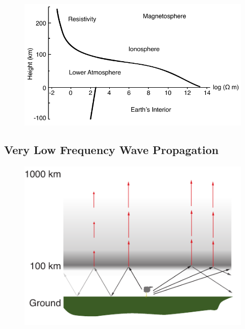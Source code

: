 \begin{figure}[ht!]
	\centering
	\includegraphics[scale=1]{Introduction/Figures/Atmospheric_Conductivity.pdf}\\
	\caption{}
	\label{intro:fig:ionosphere}
\end{figure}


\subsection{Very Low Frequency Wave Propagation}

\begin{figure}[ht!]
	\centering
	\includegraphics[scale=1]{Introduction/Figures/EIWG.pdf}\\
	\caption{}
	\label{intro:fig:eiwg}
\end{figure}


